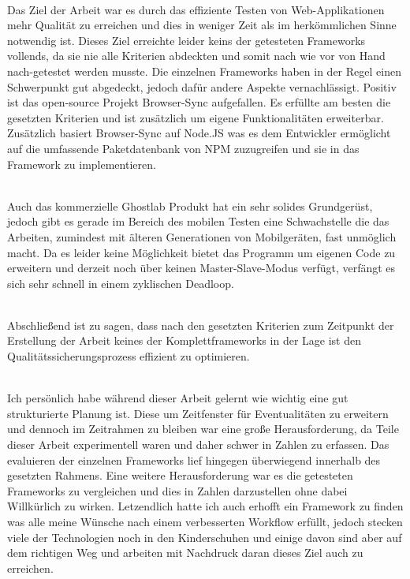 \\Das Ziel der Arbeit war es durch das effiziente Testen von Web-Applikationen mehr Qualität zu erreichen und dies in weniger Zeit als im herkömmlichen Sinne notwendig ist. Dieses Ziel erreichte leider keins der getesteten Frameworks vollends, da sie nie alle Kriterien abdeckten und somit nach wie vor von Hand nach-getestet werden musste. 
Die einzelnen Frameworks haben in der Regel einen Schwerpunkt gut abgedeckt, jedoch dafür andere Aspekte vernachlässigt. Positiv ist das open-source Projekt Browser-Sync aufgefallen. Es erfüllte am besten die gesetzten Kriterien und ist zusätzlich um eigene Funktionalitäten erweiterbar. Zusätzlich basiert Browser-Sync auf Node.JS was es dem Entwickler ermöglicht auf die umfassende Paketdatenbank von NPM zuzugreifen und sie in das Framework zu implementieren. 

\\Auch das kommerzielle Ghostlab Produkt hat ein sehr solides Grundgerüst, jedoch gibt es gerade im Bereich des mobilen Testen eine Schwachstelle die das Arbeiten, zumindest mit älteren Generationen von Mobilgeräten, fast unmöglich macht. Da es leider keine Möglichkeit bietet das Programm um eigenen Code zu erweitern und derzeit noch über keinen Master-Slave-Modus verfügt, verfängt es sich sehr schnell in einem zyklischen Deadloop.

\\Abschließend ist zu sagen, dass nach den gesetzten Kriterien zum Zeitpunkt der Erstellung der Arbeit keines der Komplettframeworks in der Lage ist den Qualitätssicherungsprozess effizient zu optimieren.

\\Ich persönlich habe während dieser Arbeit gelernt wie wichtig eine gut strukturierte Planung ist. Diese um Zeitfenster für Eventualitäten zu erweitern und dennoch im Zeitrahmen zu bleiben war eine große Herausforderung, da Teile dieser Arbeit experimentell waren und daher schwer in Zahlen zu erfassen. Das evaluieren der einzelnen Frameworks lief hingegen überwiegend innerhalb des gesetzten Rahmens. Eine weitere Herausforderung war es die getesteten Frameworks zu vergleichen und dies in Zahlen darzustellen ohne dabei Willkürlich zu wirken. Letzendlich hatte ich auch erhofft ein Framework zu finden was alle meine Wünsche nach einem verbesserten Workflow erfüllt, jedoch stecken viele der Technologien noch in den Kinderschuhen und einige davon sind aber auf dem richtigen Weg und arbeiten mit Nachdruck daran dieses Ziel auch zu erreichen.

